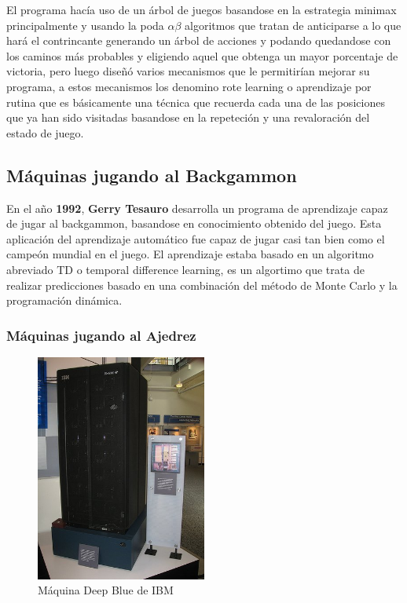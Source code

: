 \documentclass[a4paper, 11pt]{article} %
\begin{document}
El programa hacía uso de un árbol de juegos basandose en la estrategia minimax principalmente y usando la poda $\alpha\beta$ algoritmos que tratan de anticiparse a lo que hará el contrincante generando un árbol de acciones y podando quedandose con los caminos más probables y eligiendo aquel que obtenga un mayor porcentaje de victoria, pero luego diseñó varios mecanismos que le permitirían mejorar su programa, a estos mecanismos los denomino rote learning o aprendizaje por rutina que es básicamente una técnica que recuerda cada una de las posiciones que ya han sido visitadas basandose en la repeteción y una revaloración del estado de juego.

\subsection{Máquinas jugando al Backgammon}
En el año \textbf{1992}, \textbf{Gerry Tesauro} desarrolla un programa de aprendizaje capaz de jugar al backgammon, basandose en conocimiento obtenido del juego. Esta aplicación del aprendizaje automático fue capaz de jugar casi tan bien como el campeón mundial en el juego. El aprendizaje estaba basado en un algoritmo abreviado TD o temporal difference learning, es un algortimo que trata de realizar predicciones basado en una combinación del método de Monte Carlo y la programación dinámica.

\subsubsection{Máquinas jugando al Ajedrez}

\begin{figure}[H]
\centering
\includegraphics[width=0.5\textwidth]{deepblue}
\caption{Máquina Deep Blue de IBM}
\label{Ejemplo kNN}
\end{figure}
\end{document}
